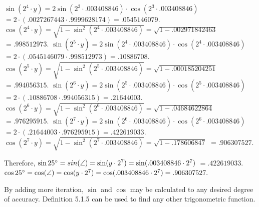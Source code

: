 $\sin(2^{4}\cdot y) = 2\sin(2^{3}\cdot.003408846)\cdot\cos(2^{3}\cdot.003408846)$\nl
$ = 2\cdot(.0027267443\cdot.9999628174) = .0545146079.$\nl
$\cos(2^{4}\cdot y) = \sqrt{1 - \sin^{2}(2^{4}\cdot.003408846)} = \sqrt{1 - .002971842463}$\nl
$ = .998512973.$\nl
$\sin(2^{5}\cdot y) = 2\sin(2^{4}\cdot.003408846)\cdot\cos(2^{4}\cdot.003408846)$\nl
$ = 2\cdot(.0545146079\cdot.998512973) = .10886708.$\nl
$\cos(2^{5}\cdot y) = \sqrt{1 - \sin^{2}(2^{5}\cdot.003408846)} = \sqrt{1 - .000185204251}$\nl
$ = .994056315.$\nl
$\sin(2^{6}\cdot y) = 2\sin(2^{5}\cdot.003408846)\cdot\cos(2^{5}\cdot.003408846)$\nl
$ = 2\cdot(.10886708\cdot.994056315) = .21644003.$\nl
$\cos(2^{6}\cdot y) = \sqrt{1 - \sin^{2}(2^{6}\cdot.003408846)} = \sqrt{1 - .04684622864}$\nl
$ = .976295915.$\nl
$\sin(2^{7}\cdot y) = 2\sin(2^{6}\cdot.003408846)\cdot\cos(2^{6}\cdot.003408846)$\nl
$ = 2\cdot(.21644003\cdot.976295915) = .422619033.$\nl
$\cos(2^{7}\cdot y) = \sqrt{1 - \sin^{2}(2^{7}\cdot.003408846)} = \sqrt{1 - .178606847}$\nl
$ = .906307527.$\nl


Therefore, $\sin 25^{\circ} = sin(\angle) = \sin(y\cdot2^{7}) = \sin(.003408846\cdot2^{7})$\nl
$ = .422619033.$\nl
$\cos 25^{\circ} = \cos(\angle) = \cos(y\cdot2^{7}) = \cos(.003408846\cdot2^{7}) = .906307527.$\nl

By adding more iteration, $\sin$ and $\cos$ may be calculated to any desired degree of accuracy.  Definition 5.1.5 can be used to find any other trigonometric function.\nl




